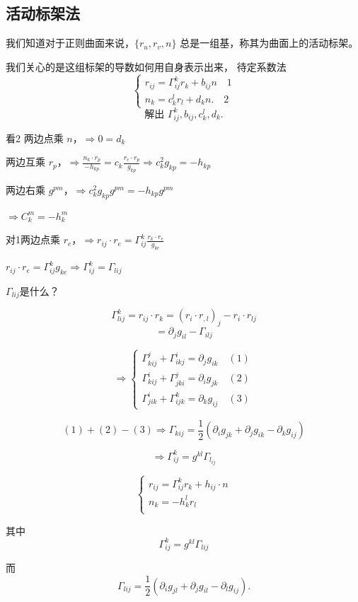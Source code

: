 \documentclass[lang=cn,10pt,thmcnt=section]{elegantbook}
\begin{document}
\subsection{活动标架法}
我们知道对于正则曲面来说，$\{r_u, r_v, n\}$ 总是一组基，称其为曲面上的活动标架。

我们关心的是这组标架的导数如何用自身表示出来，
待定系数法
\[
\begin{cases}
r_{ij} = \Gamma_{ij}^k r_k + b_{ij} n \quad 1\\
n_k = c_k^l r_l + d_k n.\quad 2
\end{cases}
\]
\[
\text{解出 } \Gamma_{ij}^k, b_{ij}, c_k^l, d_k.
\]

看2 两边点乘 $n$，$\Rightarrow 0 = d_k$

两边互乘 $r_p$，$\Rightarrow \frac{n_k \cdot r_p}{-h_{kp}} = c_k \frac{r_e \cdot r_p}{g_{kp}} \Rightarrow c_k^2 g_{kp} = -h_{kp}$

两边右乘 $g^{pm}$，$\Rightarrow c_k^2 g_{kp} g^{pm} = -h_{kp} g^{pm}$

$\Rightarrow C_k^m = -h_k^m$

对1两边点乘 $r_e$，$\Rightarrow r_{ij} \cdot r_e = \Gamma_{ij}^k \frac{r_k \cdot r_e}{g_{ke}}$

$r_{ij} \cdot r_e = \Gamma_{ij}^k g_{ke} \Rightarrow \Gamma_{ij}^k = \Gamma_{lij}$

$\Gamma_{lij} $是什么？

\[
    \Gamma^{k}_{lij}  = r_{ij} \cdot r_k = (r_i \cdot r_{,l})_j - r_i \cdot r_{lj}
\]
\[
= \partial_j g_{il} - \Gamma_{ilj}
\]

\[
\Rightarrow
\begin{cases}
\Gamma_{kij}^j + \Gamma_{ikj}^i = \partial_j g_{ik} \quad (1) \\
\Gamma_{kij}^i + \Gamma_{jki}^j = \partial_i g_{jk} \quad (2) \\
\Gamma_{jik}^i + \Gamma_{ijk}^k = \partial_k g_{ij} \quad (3)
\end{cases}
\]

\[
(1) + (2) - (3) \Rightarrow \Gamma_{kij}  = \frac{1}{2} (\partial_i g_{jk} + \partial_j g_{ik} - \partial_k g_{ij})
\]

\[
\Rightarrow \Gamma^k_{ij} = g^{kl} \Gamma_{l_{ij}}
\]

\begin{proposition}

\[
\left\{
\begin{array}{l}
r_{ij} = \Gamma_{ij}^k r_k + h_{ij} \cdot n   \\
n_k = - h_k^l r_l \\
\end{array}
\right.
\]

其中
\[
\Gamma_{ij}^k = g^{kl} \Gamma_{lij}
\]

而
\[
\Gamma_{lij} = \frac{1}{2} (\partial_i g_{jl} + \partial_j g_{il} - \partial_l g_{ij}).
\]

\end{proposition}
\end{document}
